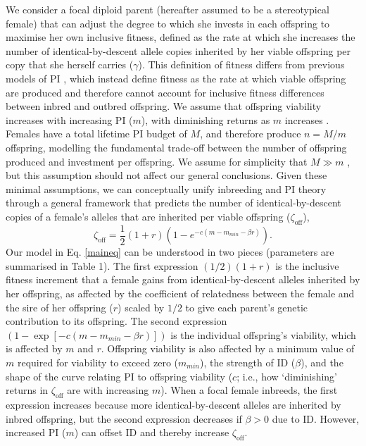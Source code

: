 \documentclass[10pt,letterpaper]{article}
\begin{document}
We consider a focal diploid parent (hereafter assumed to be a stereotypical female) that can adjust the degree to which she invests in each offspring to maximise her own inclusive fitness, defined as the rate at which she increases the number of identical-by-descent allele copies inherited by her viable offspring per copy that she herself carries ($\gamma$). This definition of fitness differs from previous models of PI \cite[][]{Macnair1978, Parker1978}, which instead define fitness as the rate at which viable offspring are produced and therefore cannot account for inclusive fitness differences between inbred and outbred offspring. We assume that offspring viability increases with increasing PI ($m$), with diminishing returns as $m$ increases \cite[following][]{Parker1978}. Females have a total lifetime PI budget of $M$, and therefore produce $n=M/m$ offspring, modelling the fundamental trade-off between the number of offspring produced and investment per offspring. We assume for simplicity that $M \gg m$ \cite[following][]{Parker1985}, but this assumption should not affect our general conclusions. Given these minimal assumptions, we can conceptually unify inbreeding and PI theory through a general framework that predicts the number of identical-by-descent copies of a female's alleles that are inherited per viable offspring ($\zeta_{\textrm{off}}$),
\begin{equation} \label{maineq}
\zeta_{\textrm{off}} = \frac{1}{2}\left(1+r\right)\left(1-e^{-c\left(m-m_{min}-\beta r\right)}\right).
\end{equation}
Our model in Eq. \ref{maineq} can be understood in two pieces (parameters are summarised in Table 1). The first expression $\left(1/2\right) \left(1 + r\right)$ is the inclusive fitness increment that a female gains from identical-by-descent alleles inherited by her offspring, as affected by the coefficient of relatedness between the female and the sire of her offspring ($r$) scaled by $1/2$ to give each parent's genetic contribution to its offspring. The second expression $\left(1 - \exp\left[-c\left(m-m_{min}-\beta r\right)\right]\right)$ is the individual offspring's viability, which is affected by $m$ and $r$. Offspring viability is also affected by a minimum value of $m$ required for viability to exceed zero ($m_{min}$), the strength of ID ($\beta$), and the shape of the curve relating PI to offspring viability ($c$; i.e., how `diminishing' returns in $\zeta_{\textrm{off}}$ are with increasing $m$). When a focal female inbreeds, the first expression increases because more identical-by-descent alleles are inherited by inbred offspring, but the second expression decreases if $\beta>0$ due to ID. However, increased PI ($m$) can offset ID and thereby increase $\zeta_{\textrm{off}}$.
\end{document}
